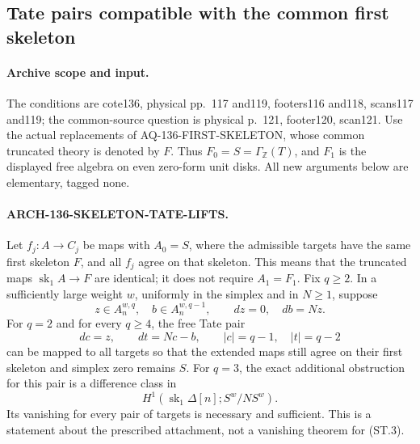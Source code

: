 \subsection{Tate pairs compatible with the common first skeleton}
\label{arch136:sk1-tate}

\paragraph{Archive scope and input.}
The conditions are cote136, physical pp.~117 and119, footers116
and118, scans117 and119; the common-source question is physical
p.~121, footer120, scan121. Use the actual replacements of
AQ-136-FIRST-SKELETON, whose common truncated theory is denoted
by \(F\). Thus \(F_0=S=\Gamma_{\mathbb Z}(T)\), and \(F_1\)
is the displayed free algebra on even zero-form unit disks.
All new arguments below are elementary, tagged none.

\paragraph{ARCH-136-SKELETON-TATE-LIFTS.}
Let \(f_j:A\to C_j\) be maps with \(A_0=S\), where the
admissible targets have the same first skeleton \(F\), and all
\(f_j\) agree on that skeleton. This means that the truncated
maps \(\operatorname{sk}_1 A\to F\) are identical; it does
not require \(A_1=F_1\). Fix \(q\geq2\). In a sufficiently
large weight \(w\), uniformly in the simplex and in \(N\geq1\),
suppose
\[
 z\in A_n^{w,q},\quad b\in A_n^{w,q-1},\qquad
 dz=0,\quad db=Nz.                                      \tag{ST.1}
\]
For \(q=2\) and for every \(q\geq4\), the free Tate pair
\[
 dc=z,\qquad dt=Nc-b,
 \qquad |c|=q-1,\quad |t|=q-2                           \tag{ST.2}
\]
can be mapped to all targets so that the extended maps still
agree on their first skeleton and simplex zero remains \(S\).
For \(q=3\), the exact additional obstruction for this pair is
a difference class in
\[
                  H^1(\operatorname{sk}_1\Delta[n];S^w/NS^w).
                                                               \tag{ST.3}
\]
Its vanishing for every pair of targets is necessary and
sufficient. This is a statement about the prescribed attachment,
not a vanishing theorem for (ST.3).


